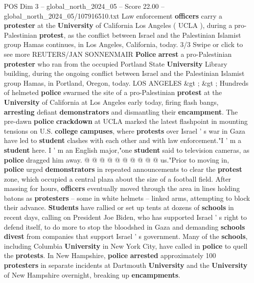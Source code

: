 \begin{textsample}{POS Dim 3 – global\_north\_2024\_05 – Score 22.00 – global\_north\_2024\_05/107916510.txt}  \label{ex:f3_pos_015}
Law enforcement \textbf{officers} carry a \textbf{protester} at the \textbf{University} of California Los Angeles ( UCLA ), during a pro-Palestinian \textbf{protest}, as the conflict between Israel and the Palestinian Islamist group Hamas continues, in Los Angeles, California, today. 3/3 Swipe or click to see more REUTERS/JAN SONNENMAIR \textbf{Police} \textbf{arrest} a pro-Palestinian \textbf{protester} who ran from the occupied Portland State \textbf{University} Library building, during the ongoing conflict between Israel and the Palestinian Islamist group Hamas, in Portland, Oregon, today.
LOS ANGELES \&gt ; \&gt ; Hundreds of helmeted \textbf{police} swarmed the site of a pro-Palestinian \textbf{protest} at the \textbf{University} of California at Los Angeles early today, firing flash bangs, \textbf{arresting} defiant \textbf{demonstrators} and dismantling their \textbf{encampment}.
The pre-dawn \textbf{police} \textbf{crackdown} at UCLA marked the latest flashpoint in mounting tensions on U.S. \textbf{college} \textbf{campuses}, where \textbf{protests} over Israel ' s war in Gaza have led to \textbf{student} clashes with each other and with law enforcement."I ' m a \textbf{student} here.
I ' m an English major,"one \textbf{student} said to television cameras, as \textbf{police} dragged him away. @ @ @ @ @ @ @ @ @ @ us."Prior to moving in, \textbf{police} urged \textbf{demonstrators} in repeated announcements to clear the \textbf{protest} zone, which occupied a central plaza about the size of a football field.
After massing for hours, \textbf{officers} eventually moved through the area in lines holding batons as \textbf{protesters} -- some in white helmets -- linked arms, attempting to block their advance. \textbf{Students} have rallied or set up tents at dozens of \textbf{schools} in recent days, calling on President Joe Biden, who has supported Israel ' s right to defend itself, to do more to stop the bloodshed in Gaza and demanding \textbf{schools} \textbf{divest} from companies that support Israel ' s government.
Many of the \textbf{schools}, including Columbia \textbf{University} in New York City, have called in \textbf{police} to quell the \textbf{protests}.
In New Hampshire, \textbf{police} \textbf{arrested} approximately 100 \textbf{protesters} in separate incidents at Dartmouth \textbf{University} and the \textbf{University} of New Hampshire overnight, breaking up \textbf{encampments}.

\end{textsample}
